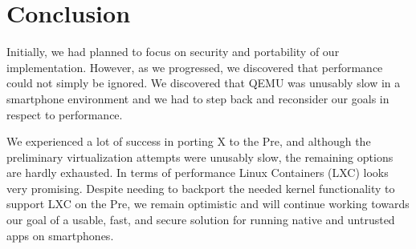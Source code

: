 \section{Conclusion}
\label{sec:conclusion}
Initially, we had planned to focus on security and portability of our implementation.  However, as we progressed, we discovered that performance could not simply be ignored.  We discovered that QEMU was unusably slow in a smartphone environment and we had to step back and reconsider our goals in respect to performance.

We experienced a lot of success in porting X to the Pre, and although the preliminary virtualization attempts were unusably slow, the remaining options are hardly exhausted.  In terms of performance Linux Containers (LXC) looks very promising.  Despite needing to backport the needed kernel functionality to support LXC on the Pre, we remain optimistic and will continue working towards our goal of a usable, fast, and secure solution for running native and untrusted apps on smartphones.

